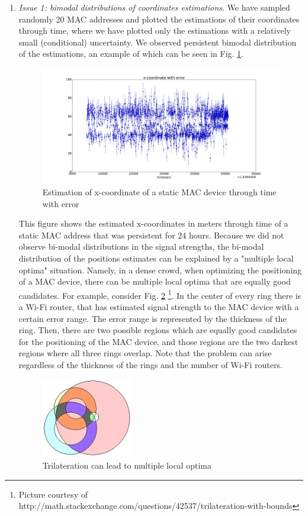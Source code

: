 \documentclass[10pt,a4paper]{article}
\begin{document}
\begin{enumerate}
	\item
	{\it Issue 1: bimodal distributions of coordinates estimations}. We have sampled randomly 20 MAC addresses and plotted the estimations of their coordinates through time, where we have plotted only the estimations with a relatively small (conditional) uncertainty. We observed persistent bimodal distribution of the estimations, an example of which can be seen in Fig. \ref{fig:bimodal}. 
		\begin{figure}[h!]
			\centering
			\includegraphics[width=120mm]{bimodal.jpg}
			\caption{Estimation of x-coordinate of a static MAC device through time with error}
			\label{fig:bimodal}
		\end{figure} 
	This figure shows the estimated x-coordinates in meters through time of a static MAC address that was persistent for 24 hours. Because we did not observe  bi-modal distributions in the signal strengths, the bi-modal distribution of the positions estimates can be explained by a "multiple local optima" situation. Namely, in a dense crowd, when optimizing the positioning of a MAC device, there can be multiple local optima that are equally good candidates. For example, consider Fig. \ref{fig:trilateration_problem} \footnote{Picture courtesy of http://math.stackexchange.com/questions/42537/trilateration-with-bounds}. In the center of every ring there is a Wi-Fi router, that has estimated signal strength to the MAC device with a certain error range. The error range is represented by the thickness of the ring. Then, there are two possible regions which are equally good candidates for the positioning of the MAC device, and those regions are the two darkest regions where all three rings overlap. Note that the problem can arise regardless of the thickness of the rings and the number of Wi-Fi routers. 	
	\begin{figure}[h!]
		\centering
		\includegraphics[width=40mm]{trilateration_problem.jpg}
		\caption{Trilateration can lead to multiple local optima}
		\label{fig:trilateration_problem}
	\end{figure}
	

\end{enumerate}
\end{document}
